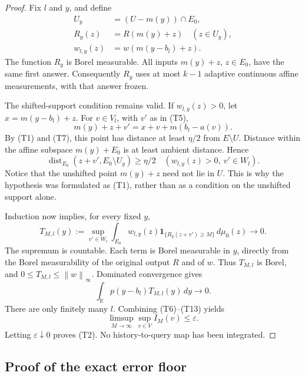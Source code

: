 \documentclass[11pt,a4paper]{article}
\newcommand{\R}{\mathbb R}
\newcommand{\norm}[1]{\left\lVert#1\right\rVert}
\theoremstyle{definition}
\theoremstyle{remark}
\numberwithin{equation}{section}
\begin{document}
\begin{proof}
Fix \(l\) and \(y\), and define
\[
\begin{split}
 U_y&=(U-m(y))\cap E_0,\\
 R_y(z)&=R(m(y)+z)\quad(z\in U_y),\\
 w_{l,y}(z)&=w(m(y-b_l)+z).
\end{split}
 \tag{T9}
\]
The function \(R_y\) is Borel measurable. All inputs \(m(y)+z\),
\(z\in E_0\), have the same first answer. Consequently \(R_y\) uses at
most \(k-1\) adaptive continuous affine measurements, with that answer
frozen.

The shifted-support condition remains valid. If \(w_{l,y}(z)>0\), let
\(x=m(y-b_l)+z\). For \(v\in V_l\), with \(v'\) as in (T5),
\[
             m(y)+z+v'=x+v+m(b_l-a(v)).
 \tag{T10}
\]
By (T1) and (T7), this point has distance at least \(\eta/2\) from
\(E\setminus U\). Distance within the affine subspace
\(m(y)+E_0\) is at least ambient distance. Hence
\[
 \operatorname{dist}_{E_0}(z+v',E_0\setminus U_y)\ge\eta/2
 \quad(w_{l,y}(z)>0,\ v'\in W_l).
 \tag{T11}
\]
Notice that the unshifted point \(m(y)+z\) need not lie in \(U\).
This is why the hypothesis was formulated as (T1), rather than as a
condition on the unshifted support alone.

Induction now implies, for every fixed \(y\),
\[
 T_{M,l}(y):=
 \sup_{v'\in W_l}\int_{E_0}w_{l,y}(z)
       \mathbf1_{\{R_y(z+v')\ge M\}}\,d\mu_0(z)
                  \longrightarrow0.
 \tag{T12}
\]
The supremum is countable. Each term is Borel measurable in \(y\),
directly from the Borel measurability of the original output \(R\)
and of \(w\). Thus \(T_{M,l}\) is Borel, and
\(0\le T_{M,l}\le\norm w_\infty\). Dominated convergence gives
\[
                 \int_\R p(y-b_l)T_{M,l}(y)\,dy\longrightarrow0 .
 \tag{T13}
\]
There are only finitely many \(l\). Combining (T6)--(T13) yields
\[
                    \limsup_{M\to\infty}\sup_{v\in V}I_M(v)
                         \le\varepsilon .
\]
Letting \(\varepsilon\downarrow0\) proves (T2). No history-to-query
map has been integrated.
\end{proof}

\subsection{Proof of the exact error floor}
\end{document}
